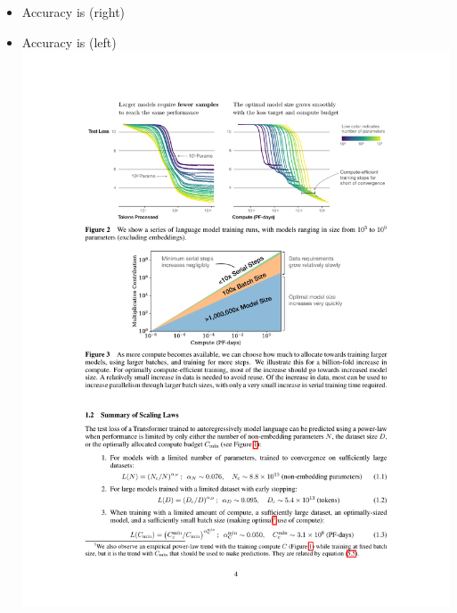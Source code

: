 \documentclass[9pt]{report}
\begin{document}
{
\begin{itemize}
\item Accuracy is  (right)
\item Accuracy is  (left)
  \\[8pt]
  \includegraphics[height=0.6\textheight]{img/accuracy-vs-tokens-size.pdf}
  \quad

\end{itemize}}
\end{document}
